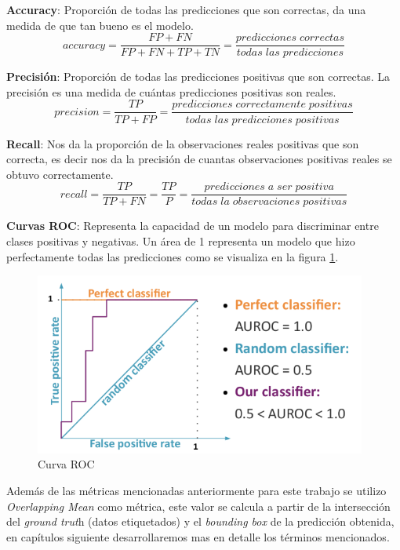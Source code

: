 \textbf{Accuracy}: Proporción de todas las predicciones que son correctas, da una medida de que tan bueno es el modelo.
\begin{equation}
accuracy = \frac{FP+FN}{FP+FN+TP+TN}=\frac{predicciones\;correctas}{todas\;las\;predicciones}
\end{equation}

\textbf{Precisión}: Proporción de todas las predicciones positivas que son correctas. La precisión es una medida de cuántas predicciones positivas son reales.
\begin{equation}
precision=\frac{TP}{TP+FP}= \frac{predicciones\;correctamente\;positivas}{todas\;las\;predicciones\;positivas}
\end{equation}

\textbf{Recall}: Nos da la proporción de la observaciones reales positivas que son correcta, es decir nos da la precisión de cuantas observaciones positivas reales se obtuvo correctamente.
\begin{equation}
recall = \frac{TP}{TP+FN} = \frac{TP}{P} = \frac{predicciones\;a\;ser\;positiva}{todas\;la\;observaciones\;positivas} 
\end{equation}

\textbf{Curvas ROC}: Representa la capacidad de un modelo para discriminar entre clases positivas y negativas. Un área de 1 representa un modelo que hizo perfectamente todas las predicciones como se visualiza en la figura \ref{Fig: roc}.
\begin{figure}[H]
 \centering
  \includegraphics[height=6cm,keepaspectratio=true,clip=true]{imagenes/MarcoTeorico/curvas-roc.png}
  \caption{Curva ROC} \label{Fig: roc}
\end{figure}

Además de las métricas mencionadas anteriormente para este trabajo se utilizo \textit{Overlapping Mean} como métrica, este valor se calcula a partir de la intersección del \textit{ground trut}h (datos etiquetados) y el\textit{ bounding box} de la predicción obtenida, en capítulos siguiente desarrollaremos mas en detalle los términos mencionados.


